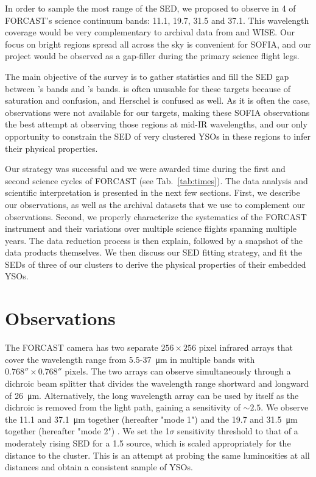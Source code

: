 In order to sample the most range of the SED, we proposed to observe in 4 of FORCAST's science continuum bands: 11.1, 19.7, 31.5 and \SI{37.1}{\micron}. This wavelength coverage would be very complementary to archival data from \Spitzer and WISE. Our focus on bright regions spread all across the sky is convenient for SOFIA, and our project would be observed as a gap-filler during the primary science flight legs.

The main objective of the survey is to gather statistics and fill the SED gap between {\Spitzer}'s bands and {\Herschel}'s bands. \Spitzer is often unusable for these targets because of saturation and confusion, and Herschel is confused as well. As it is often the case, \Herschel observations were not available for our targets, making these SOFIA observations the best attempt at observing those regions at mid-IR wavelengths, and our only opportunity to constrain the SED of very clustered YSOs in these regions to infer their physical properties.



Our strategy was successful and we were awarded time during the first and second science cycles of FORCAST (see Tab.~\ref{tab:times}). The data analysis and scientific interpretation is presented in the next few sections. First, we describe our observations, as well as the archival datasets that we use to complement our observations. Second, we properly characterize the systematics of the FORCAST instrument and their variations over multiple science flights spanning multiple years. The data reduction process is then explain, followed by a snapshot of the data products themselves. We then discuss our SED fitting strategy, and fit the SEDs of three of our clusters to derive the physical properties of their embedded YSOs.


\section{Observations}
\label{subsec:SOFIAObservations}

The FORCAST camera has two separate $256\times 256$ pixel infrared arrays that cover the wavelength range from 5.5-\SI{37}{\um} in multiple bands with $\ang{;;0.768}\times\ang{;;0.768}$ pixels. The two arrays can observe simultaneously through a dichroic beam splitter that divides the wavelength range shortward and longward of \SI{26}{\um}. Alternatively, the long wavelength array can be used by itself as the dichroic is removed from the light path, gaining a sensitivity of $\sim 2.5$. We observe the 11.1 and \SI{37.1}{\um} together (hereafter "mode 1") and the 19.7 and \SI{31.5}{\um} together (hereafter "mode 2") . We set the 1$\sigma$ sensitivity threshold to that of a moderately rising SED for a \SI{1.5}{\Lsun} source, which is scaled appropriately for the distance to the cluster. This is an attempt at probing the same luminosities at all distances and obtain a consistent sample of YSOs. 

